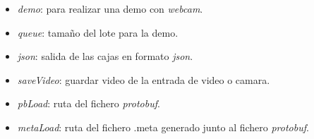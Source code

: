\begin{itemize}
	\item \textit{demo}: para realizar una demo con \textit{webcam}.
	\item \textit{queue}: tamaño del lote para la demo.
	\item \textit{json}: salida de las cajas en formato \textit{json}.
	\item \textit{saveVideo}: guardar video de la entrada de video o camara.
	\item \textit{pbLoad}: ruta del fichero \textit{protobuf}.
	\item \textit{metaLoad}: ruta del fichero .meta generado junto al fichero \textit{protobuf}.
\end{itemize}

\begin{comment}
\section{Pruebas del sistema}
\end{comment}